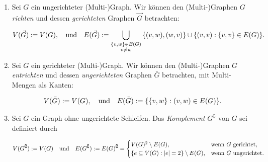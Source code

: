         \begin{definition} \label{def:operations_unary}

            \begin{enumerate}[
                label = \arabic*.,
                wide,
                labelindent = 0pt
            ]

                \item Sei $G$ ein ungerichteter (Multi-)Graph.
                Wir können den (Multi-)Graphen $G$ \textit{richten} und dessen \textit{gerichteten} Graphen $\vec G$ betrachten:
    
                \begin{align*}
                    V(\vec G) := V(G),
                    \quad
                    \text{und}
                    \quad
                    E(\vec G) := \bigcup_{\substack{{\left \{ v, w \right \}} \in E(G) \\ v \neq w}} {\left \{ (v, w), (w, v) \right \}} \cup {\left \{ (v, v): {\left \{ v, v \right \}} \in E(G) \right \}}.
                \end{align*}

                \item Sei $G$ ein gerichteter (Multi-)Graph.
                Wir können den (Multi-)Graphen $G$ \textit{entrichten} und dessen \textit{ungerichteten} Graphen $\bar G$ betrachten, mit Multi-Mengen als Kanten:
    
                \begin{align*}
                    V(\bar G) := V(G),
                    \quad
                    \text{und}
                    \quad
                    E(\bar G) := {\left \{ {\left \{ v, w \right \}}: (v, w) \in E(G) \right \}}.
                \end{align*}

                \item Sei $G$ ein Graph ohne ungerichtete Schleifen.
                Das \textit{Komplement} $G^\complement$ von $G$ sei definiert durch

                \begin{align*}
                    V(G^\complement) := V(G)
                    \quad
                    \text{und}
                    \quad
                    E(G^\complement)
                    :=
                    E(G)^\complement
                    =
                    \begin{cases}
                        V(G)^2 \setminus E(G),
                        & \text{wenn} ~ G ~ \text{gerichtet}, \\
                        {\left \{ e \subseteq V(G): |e| = 2 \right \}} \setminus E(G),
                        & \text{wenn} ~ G ~ \text{ungerichtet}.
                    \end{cases}
                \end{align*}


\end{enumerate}
\end{definition}
